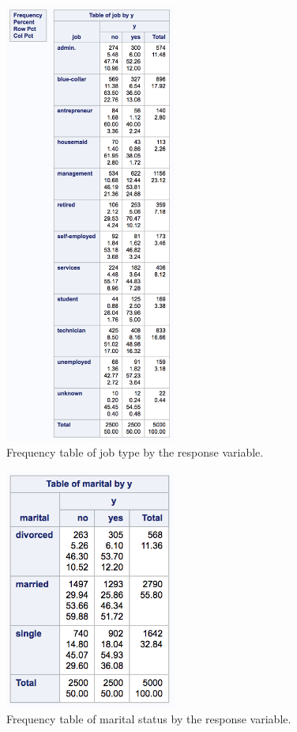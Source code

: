 \documentclass[]{article}
\begin{document}
\begin{figure}
  \centering
    \includegraphics[width=0.5\textwidth]{images/fig5_job.png}
  \caption{Frequency table of job type by the response variable.}
  \label{fig5}
\end{figure}

\begin{figure}
  \centering
    \includegraphics[width=0.5\textwidth]{images/fig6_marital.png}
  \caption{Frequency table of marital status by the response variable.}
  \label{fig6}
\end{figure}
\end{document}
